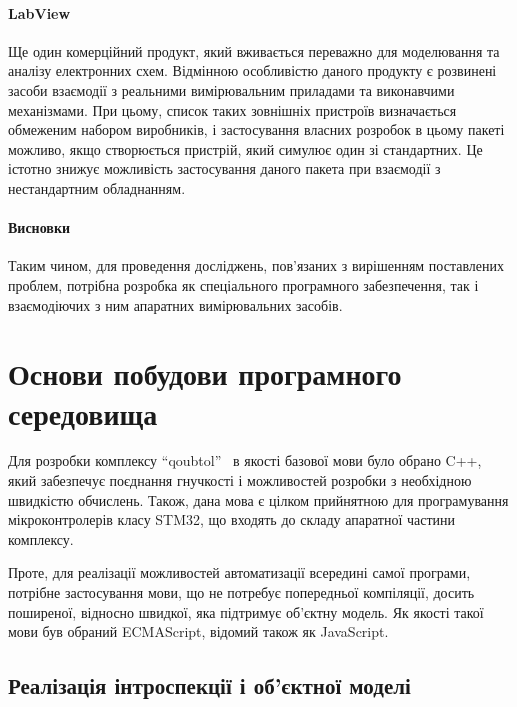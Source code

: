 \paragraph{LabView}

Ще один комерційний продукт, який вживається переважно для моделювання
та аналізу електронних схем. Відмінною особливістю даного
продукту є розвинені засоби взаємодії з реальними вимірювальним
приладами та виконавчими механізмами. При цьому, список таких
зовнішніх пристроїв визначається обмеженим набором виробників,
і застосування власних розробок в цьому пакеті можливо, якщо
створюється пристрій, який симулює один зі стандартних. Це істотно
знижує можливість застосування даного пакета при взаємодії з
нестандартним обладнанням.



\paragraph{Висновки}

Таким чином, для проведення досліджень, пов'язаних з вирішенням
поставлених проблем, потрібна розробка як спеціального
програмного забезпечення, так і взаємодіючих з ним апаратних
вимірювальних засобів.





\section{Основи побудови програмного середовища} %

Для розробки комплексу ``qoubtol''~\cite{atu_asau26,atu_asau27}
в якості базової мови було обрано C++,
який забезпечує поєднання гнучкості і можливостей розробки
з необхідною швидкістю обчислень. Також, дана мова є цілком
прийнятною для програмування мікроконтролерів класу STM32, що
входять до складу апаратної частини комплексу.

Проте, для реалізації можливостей автоматизації всередині самої
програми, потрібне застосування мови, що не потребує попередньої
компіляції, досить поширеної, відносно швидкої, яка підтримує об'єктну
модель. Як якості такої мови був обраний ECMAScript, відомий також як JavaScript.

\subsection{Реалізація інтроспекції і об'єктної моделі} %

